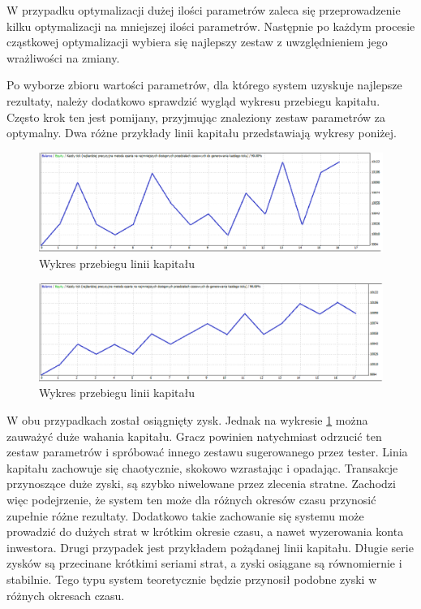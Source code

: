 \documentclass[pdflatex,11pt]{aghdpl}
\begin{document}
W przypadku optymalizacji dużej ilości parametrów zaleca się przeprowadzenie kilku optymalizacji na mniejszej ilości parametrów. Następnie po każdym procesie cząstkowej optymalizacji wybiera się najlepszy zestaw z uwzględnieniem jego wrażliwości na zmiany.
 
Po wyborze zbioru wartości parametrów, dla którego system uzyskuje najlepsze rezultaty, należy dodatkowo sprawdzić wygląd wykresu przebiegu kapitału. Często krok ten jest pomijany, przyjmując znaleziony zestaw parametrów za optymalny. Dwa różne przykłady linii kapitału przedstawiają wykresy poniżej.
\begin{figure}[h!]
\begin{center}
\includegraphics[width=12cm]{optymalizacja_zla.png}
\caption{Wykres przebiegu linii kapitału}
\label{liniakapzla}
\end{center}
\end{figure} 
\begin{figure}[h!]
\begin{center}
\includegraphics[width=12cm]{optymalizacja_dobra.png}
\caption{Wykres przebiegu linii kapitału}
\label{liniakapdobra}
\end{center}
\end{figure} 
W obu przypadkach został osiągnięty zysk. Jednak na wykresie \ref{liniakapzla} można zauważyć duże wahania kapitału. Gracz powinien natychmiast odrzucić ten zestaw parametrów i spróbować innego zestawu sugerowanego przez tester. Linia kapitału zachowuje się chaotycznie, skokowo wzrastając i opadając. Transakcje przynoszące duże zyski, są szybko niwelowane przez zlecenia stratne. Zachodzi więc podejrzenie, że system ten może dla różnych okresów czasu przynosić zupełnie różne rezultaty. Dodatkowo takie zachowanie się systemu może prowadzić do dużych strat w krótkim okresie czasu, a nawet wyzerowania konta inwestora. Drugi przypadek jest przykładem pożądanej linii kapitału. Długie serie zysków są przecinane krótkimi seriami strat, a zyski osiągane są równomiernie i stabilnie. Tego typu system teoretycznie będzie przynosił podobne zyski w różnych okresach czasu.
\end{document}
